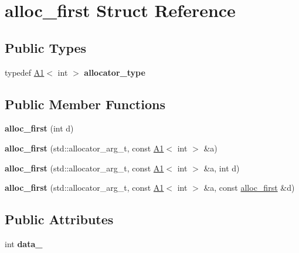 \hypertarget{structalloc__first}{}\section{alloc\+\_\+first Struct Reference}
\label{structalloc__first}
\subsection*{Public Types}
\begin{DoxyCompactItemize}
\item 
\mbox{\label{structalloc__first_a7529a352b5c0d0891bc97e99d5b18e48}} 
typedef \mbox{\hyperlink{struct_a1}{A1}}$<$ int $>$ {\bfseries allocator\+\_\+type}
\end{DoxyCompactItemize}
\subsection*{Public Member Functions}
\begin{DoxyCompactItemize}
\item 
\mbox{\label{structalloc__first_ae3b427d564bc273d307c45998b2f361b}} 
{\bfseries alloc\+\_\+first} (int d)
\item 
\mbox{\label{structalloc__first_ab136e205be02ddff03f7cc0458b086e8}} 
{\bfseries alloc\+\_\+first} (std\+::allocator\+\_\+arg\+\_\+t, const \mbox{\hyperlink{struct_a1}{A1}}$<$ int $>$ \&a)
\item 
\mbox{\label{structalloc__first_a90c770b9bcbd0ae83f51bb91a0a78d3e}} 
{\bfseries alloc\+\_\+first} (std\+::allocator\+\_\+arg\+\_\+t, const \mbox{\hyperlink{struct_a1}{A1}}$<$ int $>$ \&a, int d)
\item 
\mbox{\label{structalloc__first_a37993ffff5db48bbcf5ead0347a7a0f4}} 
{\bfseries alloc\+\_\+first} (std\+::allocator\+\_\+arg\+\_\+t, const \mbox{\hyperlink{struct_a1}{A1}}$<$ int $>$ \&a, const \mbox{\hyperlink{structalloc__first}{alloc\+\_\+first}} \&d)
\end{DoxyCompactItemize}
\subsection*{Public Attributes}
\begin{DoxyCompactItemize}
\item 
\mbox{\label{structalloc__first_acc40fa9694b9b550b1988e7abca15146}} 
int {\bfseries data\+\_\+}
\end{DoxyCompactItemize}
